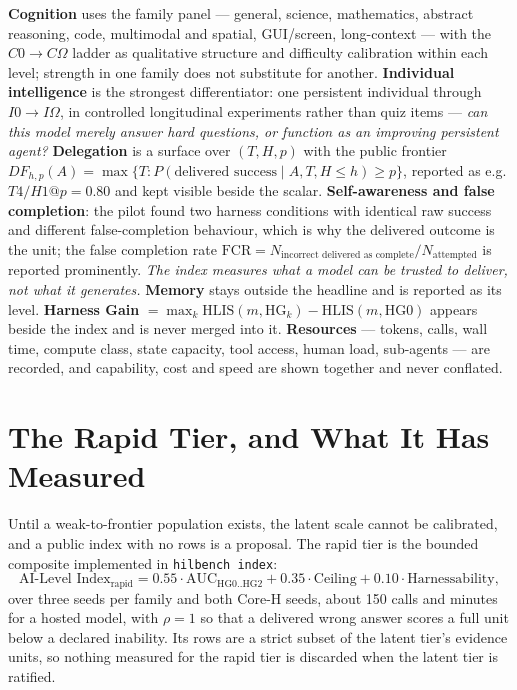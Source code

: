 \documentclass[11pt]{article}
\theoremstyle{definition}
\begin{document}
\textbf{Cognition} uses the family panel --- general, science, mathematics, abstract reasoning, code, multimodal and spatial, GUI/screen, long-context --- with the $C0 \to C\Omega$ ladder as qualitative structure and difficulty calibration within each level; strength in one family does not substitute for another. \textbf{Individual intelligence} is the strongest differentiator: one persistent individual through $I0 \to I\Omega$, in controlled longitudinal experiments rather than quiz items --- \emph{can this model merely answer hard questions, or function as an improving persistent agent?} \textbf{Delegation} is a surface over $(T, H, p)$ with the public frontier $DF_{h,p}(A) = \max\{T : P(\text{delivered success} \mid A, T, H \le h) \ge p\}$, reported as e.g. $T4/H1@p{=}0.80$ and kept visible beside the scalar. \textbf{Self-awareness and false completion}: the pilot found two harness conditions with identical raw success and different false-completion behaviour, which is why the delivered outcome is the unit; the false completion rate $\mathrm{FCR} = N_{\text{incorrect delivered as complete}} / N_{\text{attempted}}$ is reported prominently. \emph{The index measures what a model can be trusted to deliver, not what it generates.} \textbf{Memory} stays outside the headline and is reported as its level. \textbf{Harness Gain} $= \max_k \text{HLIS}(m, \mathrm{HG}_k) - \text{HLIS}(m, \mathrm{HG0})$ appears beside the index and is never merged into it. \textbf{Resources} --- tokens, calls, wall time, compute class, state capacity, tool access, human load, sub-agents --- are recorded, and capability, cost and speed are shown together and never conflated.

\section{The Rapid Tier, and What It Has Measured}\label{sec:rapid}

Until a weak-to-frontier population exists, the latent scale cannot be calibrated, and a public index with no rows is a proposal. The rapid tier is the bounded composite implemented in \texttt{hilbench index}:
\[
\text{AI-Level Index}_{\mathrm{rapid}} = 0.55\cdot\mathrm{AUC}_{\mathrm{HG0..HG2}} + 0.35\cdot\mathrm{Ceiling} + 0.10\cdot\mathrm{Harnessability},
\]
over three seeds per family and both Core-H seeds, about 150 calls and minutes for a hosted model, with $\rho = 1$ so that a delivered wrong answer scores a full unit below a declared inability. Its rows are a strict subset of the latent tier's evidence units, so nothing measured for the rapid tier is discarded when the latent tier is ratified.
\end{document}
